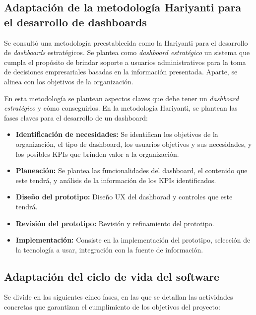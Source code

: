 \documentclass[spanish]{ieee_upb}
\begin{document}
\subsection{Adaptación de la metodología Hariyanti para el desarrollo de dashboards}

Se consultó una metodología preestablecida como la Hariyanti\cite{hariyanti-dashboard} para el
 desarrollo de \textit{dashboards} estratégicos. Se plantea como \textit{dashboard estratégico} un sistema que cumpla 
el propósito de brindar soporte a usuarios administrativos para la toma de decisiones 
empresariales basadas en la información presentada. Aparte, se alinea con los objetivos de la organización.\cite{hariyanti-dashboard}

\vspace{0.3cm}

En esta metodología se plantean aspectos claves que debe tener un \textit{dashboard estratégico} y cómo conseguirlos.
En la metodología Hariyanti, se plantean las fases claves para el desarrollo de un dashboard:

\begin{itemize}
    \item \textbf{Identificación de necesidades: }Se identifican los objetivos de la organización, el tipo de dashboard, los usuarios objetivos y sus necesidades, y los posibles KPIs que brinden valor a la organización.
    \item \textbf{Planeación: }Se plantea las funcionalidades del dashboard, el contenido que este tendrá, y análisis de la información de los KPIs identificados.
    \item \textbf{Diseño del prototipo: }Diseño UX del dashborad y controles que este tendrá.
    \item \textbf{Revisión del prototipo: }Revisión y refinamiento del prototipo.
    \item \textbf{Implementación: }Consiste en la implementación del prototipo, selección de la tecnología a usar, integración con la fuente de información.
    
\end{itemize}



\subsection{Adaptación del ciclo de vida del software}

Se divide en las siguientes cinco fases, en las que se detallan las actividades concretas que garantizan el cumplimiento de los objetivos del proyecto:
\end{document}
